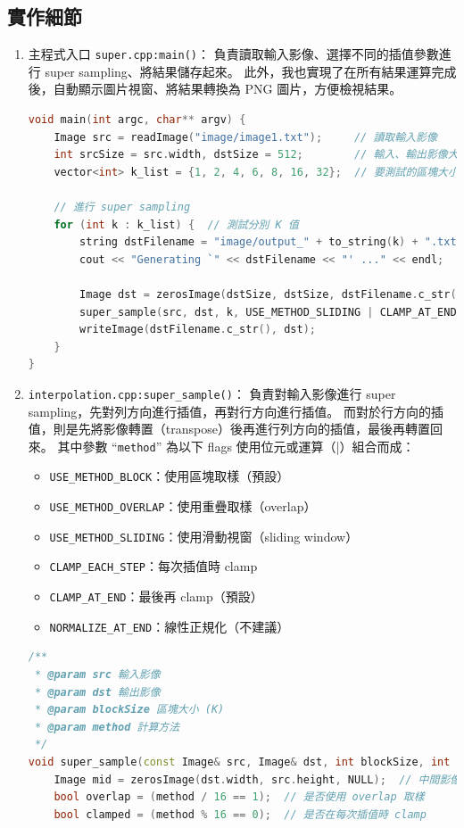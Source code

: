 \documentclass[a4paper,  10pt, oneside, fleqn]{article}
\begin{document}
\subsection*{實作細節\footnotemark}

\begin{enumerate}
    \item 主程式入口 \lstinline|super.cpp:main()|：
          負責讀取輸入影像、選擇不同的插值參數進行 super sampling、將結果儲存起來。
          此外，我也實現了在所有結果運算完成後，自動顯示圖片視窗、將結果轉換為 PNG 圖片，方便檢視結果。
          \begin{lstlisting}[language=C++]
void main(int argc, char** argv) {
    Image src = readImage("image/image1.txt");     // 讀取輸入影像
    int srcSize = src.width, dstSize = 512;        // 輸入、輸出影像大小 (N*N, M*M)
    vector<int> k_list = {1, 2, 4, 6, 8, 16, 32};  // 要測試的區塊大小列表

    // 進行 super sampling
    for (int k : k_list) {  // 測試分別 K 值
        string dstFilename = "image/output_" + to_string(k) + ".txt";
        cout << "Generating `" << dstFilename << "' ..." << endl;

        Image dst = zerosImage(dstSize, dstSize, dstFilename.c_str());  // 輸出影像
        super_sample(src, dst, k, USE_METHOD_SLIDING | CLAMP_AT_END);   // 插值
        writeImage(dstFilename.c_str(), dst);
    }
}
    \end{lstlisting}

    \item \lstinline|interpolation.cpp:super_sample()|：
          負責對輸入影像進行 super sampling，先對列方向進行插值，再對行方向進行插值。
          而對於行方向的插值，則是先將影像轉置（transpose）後再進行列方向的插值，最後再轉置回來。
          其中參數 ``\lstinline|method|'' 為以下 flags 使用位元或運算（\lstinline|||）組合而成：
          \begin{itemize}
              \item \lstinline|USE_METHOD_BLOCK|：使用區塊取樣（預設）
              \item \lstinline|USE_METHOD_OVERLAP|：使用重疊取樣（overlap）
              \item \lstinline|USE_METHOD_SLIDING|：使用滑動視窗（sliding window）
              \item \lstinline|CLAMP_EACH_STEP|：每次插值時 clamp
              \item \lstinline|CLAMP_AT_END|：最後再 clamp（預設）
              \item \lstinline|NORMALIZE_AT_END|：線性正規化（不建議）
          \end{itemize}
          \begin{lstlisting}[language=C++]
/**
 * @param src 輸入影像
 * @param dst 輸出影像
 * @param blockSize 區塊大小 (K)
 * @param method 計算方法
 */
void super_sample(const Image& src, Image& dst, int blockSize, int method) {
    Image mid = zerosImage(dst.width, src.height, NULL);  // 中間影像
    bool overlap = (method / 16 == 1);  // 是否使用 overlap 取樣
    bool clamped = (method % 16 == 0);  // 是否在每次插值時 clamp


\end{lstlisting}
\end{enumerate}
\end{document}
